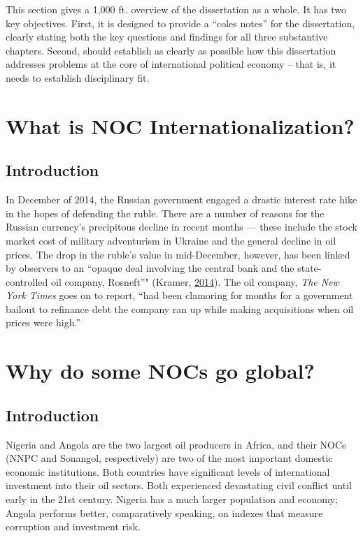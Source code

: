 \documentclass [11pt, proquest] {uwthesis}[2015/03/03]
\begin{document}
This section gives a 1,000 ft. overview of the dissertation as a whole.
It has two key objectives. First, it is designed to provide a ``coles
notes'' for the dissertation, clearly stating both the key questions and
findings for all three substantive chapters. Second, should establish as
clearly as possible how this dissertation addresses problems at the core
of international political economy -- that is, it needs to establish
disciplinary fit.

\chapter{What is NOC Internationalization?}\label{paper1}

\section{Introduction}\label{intro01}

In December of 2014, the Russian government engaged a drastic interest
rate hike in the hopes of defending the ruble. There are a number of
reasons for the Russian currency's precipitous decline in recent months
--- these include the stock market cost of military adventurism in
Ukraine and the general decline in oil prices. The drop in the ruble's
value in mid-December, however, has been linked by observers to an
``opaque deal involving the central bank and the state-controlled oil
company, Rosneft''" (Kramer,
\protect\hyperlink{ref-kramer_russias_2014}{2014}). The oil company,
\emph{The New York Times} goes on to report, ``had been clamoring for
months for a government bailout to refinance debt the company ran up
while making acquisitions when oil prices were high.''

\chapter{Why do some NOCs go global?}\label{paper2}

\section{Introduction}\label{intro02}

Nigeria and Angola are the two largest oil producers in Africa, and
their NOCs (NNPC and Sonangol, respectively) are two of the most
important domestic economic institutions. Both countries have
significant levels of international investment into their oil sectors.
Both experienced devastating civil conflict until early in the 21st
century. Nigeria has a much larger population and economy; Angola
performs better, comparatively speaking, on indexes that measure
corruption and investment risk.
\end{document}
